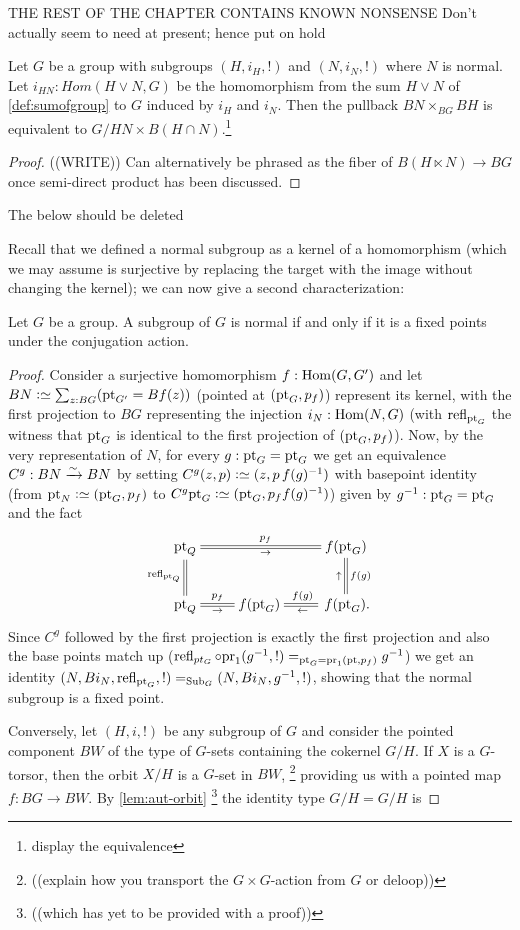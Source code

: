{\color{blue}THE REST OF THE CHAPTER CONTAINS KNOWN NONSENSE \tiny Don't actually seem to need at present; hence put on hold
\begin{lemma}
  \label{lem:iso2}
  Let $G$ be a group with subgroups $(H,i_H,!)$ and $(N,i_N,!)$ where $N$ is normal. Let $i_{HN}:Hom(H \vee N,G)$ be the homomorphism from the sum $H\vee N$ of \cref{def:sumofgroup} to $G$ induced by $i_H$ and $i_N$.  Then 
the pullback $BN\times_{BG}BH$
is equivalent to $G/{HN}\times B(H\cap N)$.\footnote{display the equivalence}
\end{lemma}
\begin{proof}
  ((WRITE)) Can alternatively be phrased as the fiber of $B(H\ltimes N)\to BG$ once semi-direct product has been discussed.
\end{proof}

The below should be deleted


Recall that we defined a normal subgroup as a kernel of a homomorphism (which we may assume is surjective by replacing the target with the image without changing the kernel); we can now give a second characterization:
\begin{lemma}
  \label{lem:normalisfixed}
  Let $G$ be a group.  A subgroup of $G$ is normal if and only if it is a fixed points under the conjugation action.
\end{lemma}
\begin{proof}
  Consider a surjective homomorphism $f:\Hom(G,G')$ and let $BN\defequi\sum_{z:BG}(\pt_{G'}=Bf(z))$ (pointed at $(\mathrm{pt}_G,p_f)$) represent its kernel, with the first projection to $BG$ representing the injection $i_N:\Hom(N,G)$ (with $\refl{\pt_G}$ the witness that $\mathrm{pt}_G$ is identical to the first projection of $(\mathrm{pt}_G,p_f)$).   Now, by the very representation of $N$, for every $g:\mathrm{pt}_G=\mathrm{pt}_G$ we get an equivalence $C^g:BN\xrightarrow{\sim} BN$ by setting $C^g(z,p)\defequi(z,p\,f(g)^{-1})$ with basepoint identity (from $\pt_N\defequi(\pt_G,p_f)$ to $C^g\pt_G\defequi (\pt_G,p_ff(g)^{-1})$) given by $g^{-1}:\mathrm{pt}_G=\mathrm{pt}_G$ and the fact 
$$\xymatrix{\pt_Q\ar@{=}[rr]^{p_f}_\to\ar@{=}[d]_{\refl{\pt_Q}}&&f(\pt_G)\\
\pt_Q\ar@{=}[r]^-{p_f}_-\to&f(\pt_G)&\,f(\pt_G).\ar@{=}[l]^\gets_{f(g)}\ar@{=}[u]^\uparrow_{f(g)}}
$$
Since $C^g$ followed by the first projection is exactly the first projection and also the base points match up (\ie $\refl{pt_G}\circ\mathrm{pr}_1(g^{-1},!)=_{\pt_G=\mathrm{pr}_1(\pt,p_f)}g^{-1}$) we get an identity $(N,Bi_N,\refl{\pt_G},!)=_{\typesubgroup_G}(N,Bi_N,g^{-1},!)$, showing that the normal subgroup is a fixed point. 

Conversely, let $(H,i,!)$ be any subgroup of $G$ and consider the pointed component $BW$ of the type of $G$-sets containing the cokernel $G/H$.  If $X$ is a $G$-torsor, then the orbit $X/H$ is a $G$-set in $BW$, \footnote{((explain how you transport the $G\times G$-action from $G$ or deloop))}
providing us with a pointed map $f:BG\to BW$.
By \cref{lem:aut-orbit} \footnote{((which has yet to be provided with a proof))} the identity type $G/H=G/H$ is 


\end{proof}}


